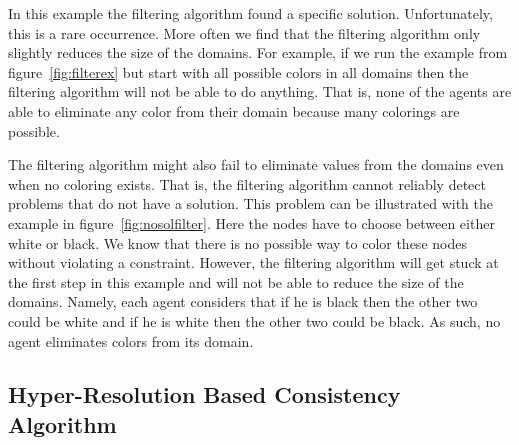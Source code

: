In this example the filtering algorithm found a specific solution.
Unfortunately, this is a rare occurrence. More often we find that the
filtering algorithm only slightly reduces the size of the domains. For
example, if we run the example from figure~\ref{fig:filterex} but
start with all possible colors in all domains then the filtering
algorithm will not be able to do anything. That is, none of the agents
are able to eliminate any color from their domain because many
colorings are possible.

\begin{SCfigure}
  \begin{minipage}{1.0\linewidth}
  \begin{center}
  \end{center}
  \end{minipage}
  \caption{Example of a problem that does not have a solution and
    the filtering algorithm cannot that fact.}
  \label{fig:nosolfilter}
\end{SCfigure}

The filtering algorithm might also fail to eliminate values from the
domains even when no coloring exists. That is, the filtering algorithm
cannot reliably detect problems that do not have a solution. This
problem can be illustrated with the example in
figure~\ref{fig:nosolfilter}. Here the nodes have to choose between
either white or black. We know that there is no possible way to color
these nodes without violating a constraint. However, the filtering
algorithm will get stuck at the first step in this example and will
not be able to reduce the size of the domains. Namely, each agent
considers that if he is black then the other two could be white and if
he is white then the other two could be black. As such, no agent
eliminates colors from its domain.

\subsection{Hyper-Resolution Based Consistency Algorithm}

